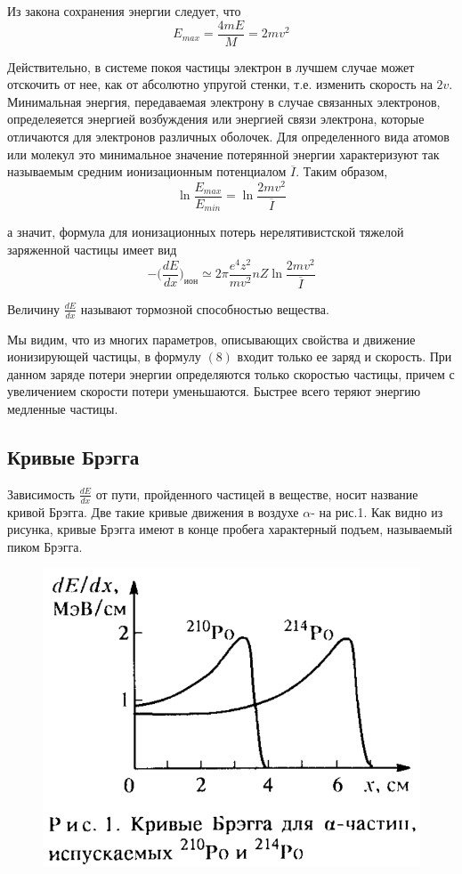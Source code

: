 \documentclass[a4paper,14pt]{extarticle}
\begin{document}
Из закона сохранения энергии следует, что
$$E_{max}=\frac{4mE}{M}=2mv^2 $$

Действительно, в системе покоя частицы электрон в лучшем случае может отскочить от нее, как от абсолютно упругой стенки, т.е. изменить скорость на $2v$. Минимальная энергия, передаваемая электрону в случае связанных электронов, определеяется энергией возбуждения или энергией связи электрона, которые отличаются для электронов различных оболочек. Для определенного вида атомов или молекул это минимальное значение потерянной энергии характеризуют так называемым средним ионизационным потенциалом $\overline{I}$. Таким образом,
$$\ln{\frac{E_{max}}{E_{min}}}=\ln{\frac{2mv^2}{\overline{I}}} $$

а значит, формула для ионизационных потерь нерелятивистской тяжелой 
заряженной частицы имеет вид
$$-\Big(\frac{dE}{dx}\Big)_{ион} \simeq 2\pi \frac{e^4z^2}{mv^2}nZ\ln{\frac{2mv^2}{\overline{I}}} $$

Величину $\frac{dE}{dx}$ называют тормозной способностью вещества.

Мы видим, что из многих параметров, описывающих свойства и движение ионизирующей частицы, в формулу $(8)$ входит только ее заряд и скорость. При данном заряде потери энергии определяются только скоростью частицы, причем с увеличением скорости потери уменьшаются. Быстрее всего теряют энергию медленные частицы.

\subsection{Кривые Брэгга}

Зависимость $\frac{dE}{dx}$ от пути, пройденного частицей в веществе, носит название кривой Брэгга. Две такие кривые движения в воздухе $\alpha$- на рис.1. Как видно из рисунка, кривые Брэгга имеют в конце пробега характерный подъем, называемый пиком Брэгга.

\begin{figure}[h!]
	\centering
	\includegraphics[width = 0.5\linewidth]{Bregg}
\end{figure}
\end{document}
